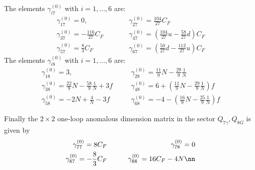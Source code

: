 The elements $\gamma^{(0)}_{i7}$ with $i=1,\ldots,6$ are:
\begin{eqnarray}
\gamma^{(0)}_{17} = 0, &\qquad&  \gamma^{(0)}_{27} =
\frac{104}{27} C_F
\label{eq:g0127} \\
\gamma^{(0)}_{37} = -\frac{116}{27} C_F
 &\qquad&  \gamma^{(0)}_{47}  = \left(\frac{104}{27} u -\frac{58}{27}d
\right) C_F
\label{eq:g0347} \\
\gamma^{(0)}_{57} = \frac{8}{3} C_F &\qquad&
\gamma^{(0)}_{67} = \left( \frac{50}{27}d -\frac{112}{27}u \right) C_F
\label{eq:g0567}
\end{eqnarray}
The elements $\gamma^{(0)}_{i8}$ with $i=1,\ldots,6$ are:
\begin{eqnarray}
\gamma^{(0)}_{18} = 3, &\quad& \gamma^{(0)}_{28} =
\frac{11}{9} N-\frac{29}{9}\frac{1}{N}
\label{eq:g0128} \\
\gamma^{(0)}_{38} = \frac{22}{9} N-\frac{58}{9}\frac{1}{N}+3 f
 &\quad& \gamma^{(0)}_{48}  = 
6+\left(\frac{11}{9} N -\frac{29}{9}\frac{1}{N}\right) f
\label{eq:g0348} \\
\gamma^{(0)}_{58} = -2 N+\frac{4}{N} -3 f  &\quad&
\gamma^{(0)}_{68} = -4-\left( \frac{16}{9} N -
\frac{25}{9}\frac{1}{N}\right) f
\label{eq:g0568}
\end{eqnarray}

Finally the $2\times 2$ one-loop anomalous dimension matrix in the
sector $Q_{7\gamma},Q_{8G}$ is given by \cite{Grin}
\begin{eqnarray}
\gamma^{(0)}_{77} = 8 C_F
&\qquad&
\gamma^{(0)}_{78} = 0
\label{gammaB0} \\
\gamma^{(0)}_{87} = -\frac{8}{3} C_F
&\qquad&
\gamma^{(0)}_{88} = 16 C_F - 4 N
\nn
\end{eqnarray}
